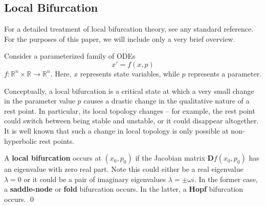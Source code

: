 \subsection{Local Bifurcation}

For a detailed treatment of local bifurcation theory, see any standard reference. For the purposes of this paper, we will include only a very brief overview. 

Consider a parameterized family of ODEs
%
\begin{equation}
	x' = f(x, p)
\end{equation}
%
$f: \mathbb{R}^n \times \mathbb{R} \to \mathbb{R}^n$. Here, $x$ represents state variables, while $p$ represents a parameter. 

%

Conceptually, a local bifurcation is a critical state at which a very small change in the parameter value $p$ causes a drastic change in the qualitative nature of a rest point. In particular, its local topology changes -- for example, the rest point could switch between being stable and unstable, or it could disappear altogether. It is well known that such a change in local topology is only possible at non-hyperbolic rest points. 

\begin{definition}
	A \textbf{local bifurcation} occurs at ${\displaystyle (x_{0}, p_{0})}$ if the Jacobian matrix ${\displaystyle {\mathbf{D}f(x_{0},p _{0})}}$ has an eigenvalue with zero real part. Note this could either be a real eigenvalue $\lambda = 0$ or it could be a pair of imaginary eigenvalues $\lambda = \pm \omega i$. In the former case, a \textbf{saddle-node} or \textbf{fold} bifurcation occurs. In the latter, a \textbf{Hopf} bifurcation occurs. \qed
\end{definition}

